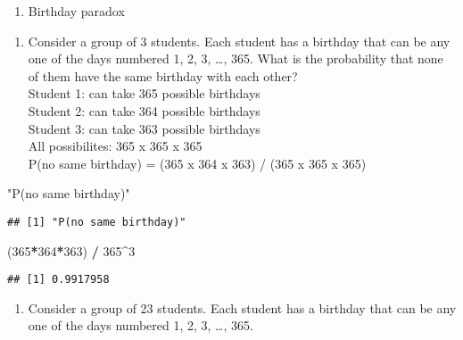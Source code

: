 \documentclass[]{article}
\newenvironment{Shaded}{\begin{snugshade}}{\end{snugshade}}
\newcommand{\DecValTok}[1]{\textcolor[rgb]{0.00,0.00,0.81}{#1}}
\newcommand{\NormalTok}[1]{#1}
\newcommand{\OperatorTok}[1]{\textcolor[rgb]{0.81,0.36,0.00}{\textbf{#1}}}
\newcommand{\StringTok}[1]{\textcolor[rgb]{0.31,0.60,0.02}{#1}}
\providecommand{\tightlist}{%
  \setlength{\itemsep}{0pt}\setlength{\parskip}{0pt}}
\begin{document}
\begin{enumerate}
\def\labelenumi{\arabic{enumi}.}
\setcounter{enumi}{1}
\tightlist
\item
  Birthday paradox\\
\end{enumerate}

\begin{enumerate}
\def\labelenumi{(\alph{enumi})}
\tightlist
\item
  Consider a group of 3 students. Each student has a birthday that can
  be any one of the days numbered 1, 2, 3, \ldots{}, 365. What is the
  probability that none of them have the same birthday with each
  other?\\
  Student 1: can take 365 possible birthdays\\
  Student 2: can take 364 possible birthdays\\
  Student 3: can take 363 possible birthdays\\
  All possibilites: 365 x 365 x 365\\
  P(no same birthday) = (365 x 364 x 363) / (365 x 365 x 365)
\end{enumerate}

\begin{Shaded}
\begin{Highlighting}[]
\StringTok{"P(no same birthday)"}
\end{Highlighting}
\end{Shaded}

\begin{verbatim}
## [1] "P(no same birthday)"
\end{verbatim}

\begin{Shaded}
\begin{Highlighting}[]
\NormalTok{(}\DecValTok{365}\OperatorTok{*}\DecValTok{364}\OperatorTok{*}\DecValTok{363}\NormalTok{) }\OperatorTok{/}\StringTok{ }\DecValTok{365}\OperatorTok{^}\DecValTok{3}
\end{Highlighting}
\end{Shaded}

\begin{verbatim}
## [1] 0.9917958
\end{verbatim}

\begin{enumerate}
\def\labelenumi{(\alph{enumi})}
\setcounter{enumi}{1}
\tightlist
\item
  Consider a group of 23 students. Each student has a birthday that can
  be any one of the days numbered 1, 2, 3, \ldots{}, 365.\\
\end{enumerate}
\end{document}
